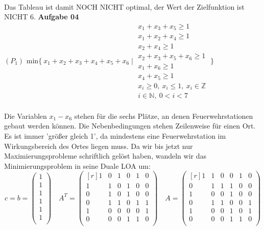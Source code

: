 \documentclass[a4paper,10pt]{article}
\begin{document}
	\\
	Das Tableau ist damit NOCH NICHT optimal, der Wert der Zielfunktion ist NICHT 6.
	\newpage
	\textbf{Aufgabe 04}\\
	$(P_1) \text{ min} \{\ x_1+x_2+x_3+x_4+x_5+x_6 \mid 
	\begin{matrix}
		x_1 + x_3 + x_5 \geq 1\\
		x_1 + x_2 + x_4 \geq 1\\
		x_2 + x_4 \geq 1\\
		x_2 + x_3 + x_5 + x_6 \geq 1\\
		x_1 + x_6 \geq 1\\
		x_4 + x_5 \geq 1 \\
		x_i \geq 0, \ x_i \leq 1, \ x_i \in \mathbb{Z}\\
		i\in \mathbb{N}, \ 0 < i < 7
	\end{matrix}
	\ \}$
	\\\\
	Die Variablen $ x_1 - x_6 $ stehen für die sechs Plätze, an denen Feuerwehrstationen gebaut werden können. Die Nebenbedingungen stehen Zeilenweise für einen Ort. Es ist immer 'größer gleich 1', da mindestens eine Feuerwehrstation im Wirkungsbereich des Ortes liegen muss. Da wir bis jetzt nur Maximierungsprobleme schriftlich gelöst haben, wandeln wir das Minimierungsproblem in seine Duale LOA um:
	\[
	c = b = 
	\begin{pmatrix}
		1\\
		1\\
		1\\
		1\\
		1\\
		1\\
	\end{pmatrix}
	\quad
	A^T =
	\begin{pmatrix*}[r]
		1 & 0 & 1 & 0 & 1 & 0\\
		1 & 1 & 0 & 1 & 0 & 0\\
		0 & 1 & 0 & 1 & 0 & 0\\
		0 & 1 & 1 & 0 & 1 & 1\\
		1 & 0 & 0 & 0 & 0 & 1\\
		0 & 0 & 0 & 1 & 1 & 0\\
	\end{pmatrix*}
	\quad
	A = 
	\begin{pmatrix*}[r]
		1 & 1 & 0 & 0 & 1 & 0\\
		0 & 1 & 1 & 1 & 0 & 0\\
		1 & 0 & 0 & 1 & 0 & 0\\
		0 & 1 & 1 & 0 & 0 & 1\\
		1 & 0 & 0 & 1 & 0 & 1\\
		0 & 0 & 0 & 1 & 1 & 0\\
	\end{pmatrix*}
	\] \\
\end{document}
